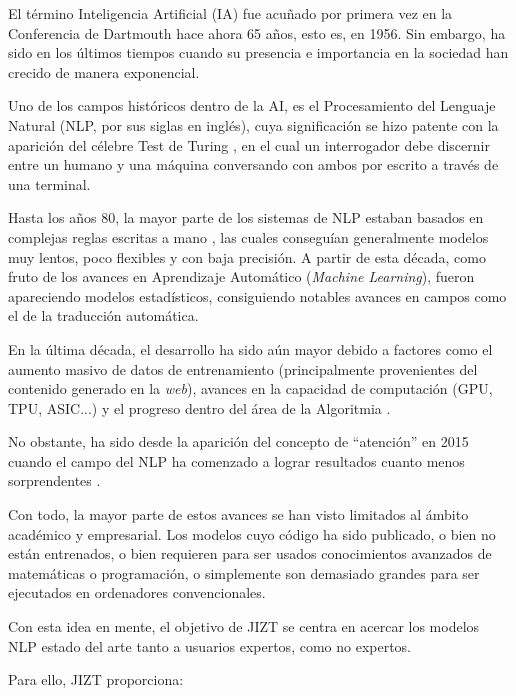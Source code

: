   \label{chapter:intro}

\vspace{-0.07cm}

El término Inteligencia Artificial (IA) fue acuñado por primera vez en la Conferencia de Dartmouth \cite{crevier95} hace ahora 65 años, esto es, en 1956. Sin embargo, ha sido en los últimos tiempos cuando su presencia e importancia en la sociedad han crecido de manera exponencial.

Uno de los campos históricos dentro de la AI, es el Procesamiento del Lenguaje Natural (NLP, por sus siglas en inglés), cuya significación se hizo patente con la aparición del célebre Test de Turing \cite{turing50}, en el cual un interrogador debe discernir entre un humano y una máquina conversando con ambos por escrito a través de una terminal.

Hasta los años 80, la mayor parte de los sistemas de NLP estaban basados en complejas reglas escritas a mano \cite{mccorduck79}, las cuales conseguían generalmente modelos muy lentos, poco flexibles y con baja precisión. A partir de esta década, como fruto de los avances en Aprendizaje Automático (\emph{Machine Learning}), fueron apareciendo modelos estadísticos, consiguiendo notables avances en campos como el de la traducción automática.

En la última década, el desarrollo ha sido aún mayor debido a factores como el aumento masivo de datos de entrenamiento (principalmente provenientes del contenido generado en la \emph{web}), avances en la capacidad de computación (GPU, TPU, ASIC...) y el progreso dentro del área de la Algoritmia \cite{rahmfeld19}.

No obstante, ha sido desde la aparición del concepto de ``atención'' en 2015 \cite{luong15, bahdanau16, vaswani17} cuando el campo del NLP ha comenzado a lograr resultados cuanto menos sorprendentes \cite{macaulay20, wiggers21}.

Con todo, la mayor parte de estos avances se han visto limitados al ámbito académico y empresarial. Los modelos cuyo código ha sido publicado, o bien no están entrenados, o bien requieren para ser usados conocimientos avanzados de matemáticas o programación, o simplemente son demasiado grandes para ser ejecutados en ordenadores convencionales.

Con esta idea en mente, el objetivo de JIZT se centra en acercar los modelos NLP estado del arte tanto a usuarios expertos, como no expertos.

Para ello, JIZT proporciona:

